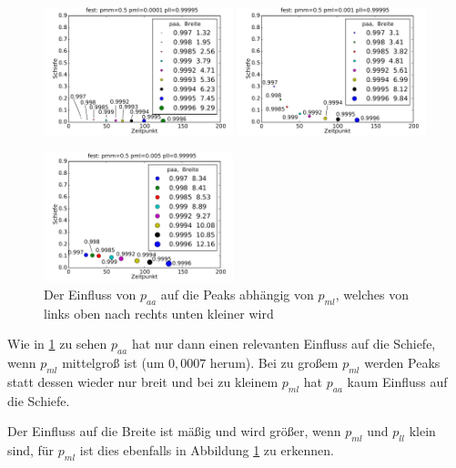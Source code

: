 \begin{figure}
\includegraphics[width=0.49\textwidth]{bilder/paa/3fest_05_00001_p_099995}
\includegraphics[width=0.49\textwidth]{bilder/paa/3fest_05_0001_p_099995}

\includegraphics[width=0.49\textwidth]{bilder/paa/3fest_05_0005_p_099995}
\caption[Der Einfluss von $p_{aa}$ auf die Peaks abhängig von $p_{ml}$]{Der Einfluss von $p_{aa}$ auf die Peaks abhängig von $p_{ml}$, welches von links oben nach rechts unten kleiner wird}
\label{einfluss_paa_pml}
\end{figure}

Wie in \ref{einfluss_paa_pml} zu sehen $p_{aa}$ hat nur dann einen relevanten Einfluss auf die Schiefe, wenn $p_{ml}$ mittelgroß ist (um $0,0007$ herum). Bei zu großem $p_{ml}$ werden Peaks statt dessen wieder nur breit und bei zu kleinem $p_{ml}$ hat $p_{aa}$ kaum Einfluss auf die Schiefe. 

Der Einfluss auf die Breite ist mäßig und wird größer, wenn $p_{ml}$ und $p_{ll}$ klein sind, für $p_{ml}$ ist dies ebenfalls in Abbildung \ref{einfluss_paa_pml} zu erkennen.

